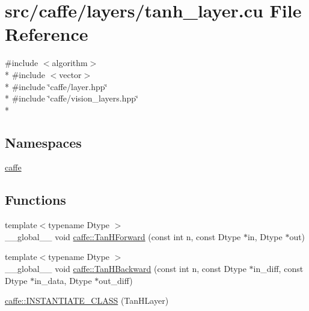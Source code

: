 \hypertarget{tanh__layer_8cu}{\section{src/caffe/layers/tanh\+\_\+layer.cu File Reference}
\label{tanh__layer_8cu}
}
{\ttfamily \#include $<$algorithm$>$}\\*
{\ttfamily \#include $<$vector$>$}\\*
{\ttfamily \#include \char`\"{}caffe/layer.\+hpp\char`\"{}}\\*
{\ttfamily \#include \char`\"{}caffe/vision\+\_\+layers.\+hpp\char`\"{}}\\*
\subsection*{Namespaces}
\begin{DoxyCompactItemize}
\item 
 \hyperlink{namespacecaffe}{caffe}
\end{DoxyCompactItemize}
\subsection*{Functions}
\begin{DoxyCompactItemize}
\item 
{\footnotesize template$<$typename Dtype $>$ }\\\+\_\+\+\_\+global\+\_\+\+\_\+ void \hyperlink{namespacecaffe_ab089b388f7d65d79e0d0e4101b097149}{caffe\+::\+Tan\+H\+Forward} (const int n, const Dtype $\ast$in, Dtype $\ast$out)
\item 
{\footnotesize template$<$typename Dtype $>$ }\\\+\_\+\+\_\+global\+\_\+\+\_\+ void \hyperlink{namespacecaffe_aea4024694e00e9eea4d70dc76d0789bb}{caffe\+::\+Tan\+H\+Backward} (const int n, const Dtype $\ast$in\+\_\+diff, const Dtype $\ast$in\+\_\+data, Dtype $\ast$out\+\_\+diff)
\item 
\hyperlink{namespacecaffe_a51e7e7c425ce80cbaec01110d4d7e914}{caffe\+::\+I\+N\+S\+T\+A\+N\+T\+I\+A\+T\+E\+\_\+\+C\+L\+A\+S\+S} (Tan\+H\+Layer)
\end{DoxyCompactItemize}
